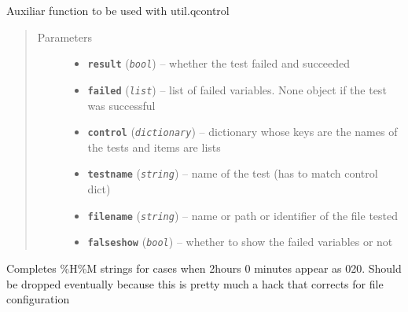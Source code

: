 \documentclass[a4paper,10pt,oneside]{sphinxmanual}
\begin{document}
\begin{fulllineitems}
\label{pymicra.algs:pymicra.algs.auxiliar.applyResult}
Auxiliar function to be used with util.qcontrol
\begin{quote}\begin{description}
\item[{Parameters}] \leavevmode\begin{itemize}
\item {} 
\textbf{\texttt{result}} (\emph{\texttt{bool}}) -- whether the test failed and succeeded

\item {} 
\textbf{\texttt{failed}} (\emph{\texttt{list}}) -- list of failed variables. None object if the test was successful

\item {} 
\textbf{\texttt{control}} (\emph{\texttt{dictionary}}) -- dictionary whose keys are the names of the tests and items are lists

\item {} 
\textbf{\texttt{testname}} (\emph{\texttt{string}}) -- name of the test (has to match control dict)

\item {} 
\textbf{\texttt{filename}} (\emph{\texttt{string}}) -- name or path or identifier of the file tested

\item {} 
\textbf{\texttt{falseshow}} (\emph{\texttt{bool}}) -- whether to show the failed variables or not

\end{itemize}

\end{description}\end{quote}

\end{fulllineitems}


\begin{fulllineitems}
\label{pymicra.algs:pymicra.algs.auxiliar.completeHM}
Completes \%H\%M strings for cases when 2hours 0 minutes appear
as 020. Should be dropped eventually because this is pretty much a hack that
corrects for file configuration

\end{fulllineitems}
\end{document}
